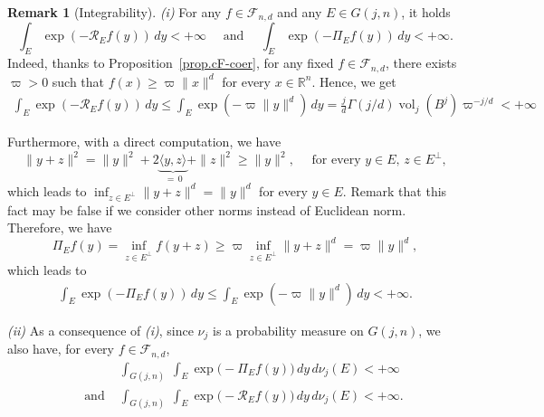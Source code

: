 \documentclass[11pt]{article}
\theoremstyle{definition}
\numberwithin{equation}{section}
\newtheorem{remark}[theorem]{Remark}
\newcommand{\R}{\mathbb{R}}
\newcommand{\cF}{\mathcal{F}}
\DeclareMathOperator{\vol}{vol}
\begin{document}
\begin{remark}[Integrability]\label{rem:integrability}
\textit{(i)} For any $f\in \cF_{n,d}$ and any $E\in G(j,n)$, it holds
\[
  \int_E \exp(-\mathscr R_E f(y))\,dy < + \infty\quad \text{ and } \quad 
  \int_E \exp(-\Pi_E f(y))\,dy< +\infty.
\]
Indeed, thanks to Proposition~\ref{prop.cF-coer}, for any fixed $f \in \cF_{n, d}$, there exists $\varpi > 0$ such that $f(x) \geq \varpi \| x \|^d$ for every $x \in \R^n$.
Hence, we get
\begin{align*}
    \int_E \exp(- \mathscr R_E f(y)) \, dy \leq \int_E \exp( - \varpi \| y \|^d) \, dy = \frac{j }{d} \Gamma(j/d) \vol_j(B^j) \varpi^{-j/d} < + \infty
\end{align*}

Furthermore, with a direct computation, we have
\begin{equation*}
    \| y + z \|^2 = \| y \|^2 + 2 \underbrace{\langle y, z \rangle}_{\, = \, 0} + \| z \|^2 \geq \| y \|^2, \quad \text{ for every  } y \in E, \, z \in E^\perp,
\end{equation*}
which leads to $\textstyle\inf_{z \in E^\perp} \| y + z \|^d = \| y \|^d$ for every $y \in E$. 
Remark that this fact may be false if we consider other norms instead of Euclidean norm.
Therefore, we have
\[
    \Pi_E f(y) = \inf_{z \in E^\perp} f(y + z) \geq \varpi \inf_{z \in E^\perp} \| y + z \|^d = \varpi \| y \|^d,
\]
which leads to
\begin{align*}
    \int_E \exp( - \Pi_E f(y)) \, dy \leq \int_E \exp(- \varpi \| y \|^d) \, dy < +\infty.
\end{align*}

\medskip

\textit{(ii)}
As a consequence of \textit{(i)}, since $\nu_j$ is a probability measure on $G(j,n)$, we also have, for every $f \in \cF_{n, d}$,
\begin{align*}
	& \int_{G(j,n)} \ \int_{E} \exp\big(-\Pi_E f(y)\big)\,dy \, d\nu_j(E) < + \infty \\
    \quad \text{ and }   & \int_{G(j,n)} \ \int_{E} \exp\big(-\mathscr R_E f(y)\big)\,dy \, d\nu_j(E) < + \infty.
\end{align*}
\end{remark}
\end{document}
